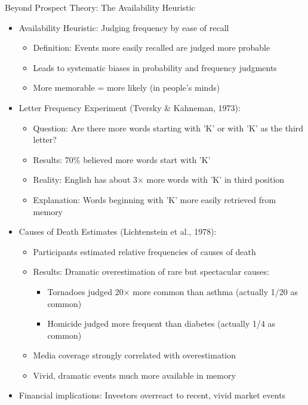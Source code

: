 \documentclass[10pt,handout]{beamer}
\begin{document}
\begin{frame}{Beyond Prospect Theory: The Availability Heuristic}
  \begin{itemize}[<+->]
    \item Availability Heuristic: Judging frequency by ease of recall
      \begin{itemize}
        \item Definition: Events more easily recalled are judged more probable
        \item Leads to systematic biases in probability and frequency judgments
        \item More memorable = more likely (in people's minds)
      \end{itemize}
    \item Letter Frequency Experiment (Tversky \& Kahneman, 1973):
      \begin{itemize}
        \item Question: Are there more words starting with 'K' or with 'K' as the third letter?
        \item Results: 70\% believed more words start with 'K'
        \item Reality: English has about 3× more words with 'K' in third position
        \item Explanation: Words beginning with 'K' more easily retrieved from memory
      \end{itemize}
    \item Causes of Death Estimates (Lichtenstein et al., 1978):
      \begin{itemize}
        \item Participants estimated relative frequencies of causes of death
        \item Results: Dramatic overestimation of rare but spectacular causes:
          \begin{itemize}
            \item Tornadoes judged 20× more common than asthma (actually 1/20 as common)
            \item Homicide judged more frequent than diabetes (actually 1/4 as common)
          \end{itemize}
        \item Media coverage strongly correlated with overestimation
        \item Vivid, dramatic events much more available in memory
      \end{itemize}
    \item Financial implications: Investors overreact to recent, vivid market events
  \end{itemize}
\end{frame}
\end{document}
